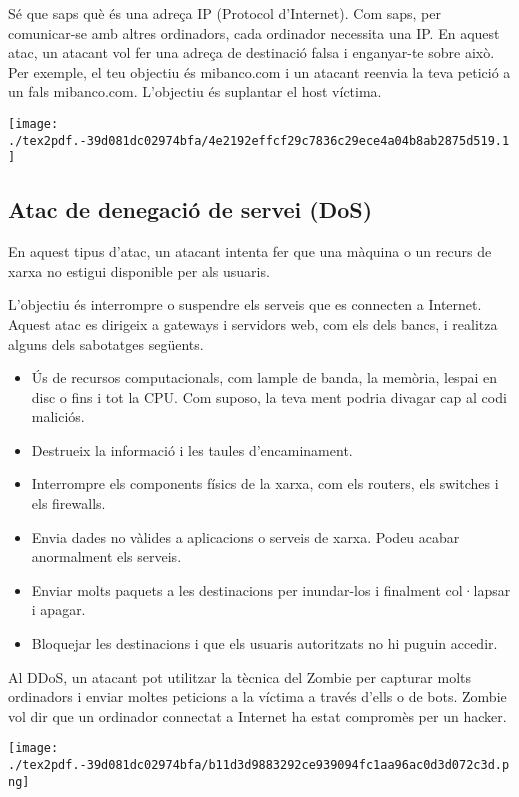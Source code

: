 \documentclass[]{article}
\begin{document}
Sé que saps què és una adreça IP (Protocol d'Internet). Com saps, per
comunicar-se amb altres ordinadors, cada ordinador necessita una IP. En
aquest atac, un atacant vol fer una adreça de destinació falsa i
enganyar-te sobre això. Per exemple, el teu objectiu és mibanco.com i un
atacant reenvia la teva petició a un fals mibanco.com. L'objectiu és
suplantar el host víctima.

\texttt{[image: ./tex2pdf.-39d081dc02974bfa/4e2192effcf29c7836c29ece4a04b8ab2875d519.1]}

\hypertarget{atac-de-denegaciuxf3-de-servei-dos}{%
\subsection{Atac de denegació de servei
(DoS)}\label{atac-de-denegaciuxf3-de-servei-dos}}

En aquest tipus d'atac, un atacant intenta fer que una màquina o un
recurs de xarxa no estigui disponible per als usuaris.

L'objectiu és interrompre o suspendre els serveis que es connecten a
Internet. Aquest atac es dirigeix ​​a gateways i servidors web, com els
dels bancs, i realitza alguns dels sabotatges següents.

\begin{itemize}
\item
  Ús de recursos computacionals, com lample de banda, la memòria, lespai
  en disc o fins i tot la CPU. Com suposo, la teva ment podria divagar
  cap al codi maliciós.
\item
  Destrueix la informació i les taules d'encaminament.
\item
  Interrompre els components físics de la xarxa, com els routers, els
  switches i els firewalls.
\item
  Envia dades no vàlides a aplicacions o serveis de xarxa. Podeu acabar
  anormalment els serveis.
\item
  Enviar molts paquets a les destinacions per inundar-los i finalment
  col·lapsar i apagar.
\item
  Bloquejar les destinacions i que els usuaris autoritzats no hi puguin
  accedir.
\end{itemize}

Al DDoS, un atacant pot utilitzar la tècnica del Zombie per capturar
molts ordinadors i enviar moltes peticions a la víctima a través d'ells
o de bots. Zombie vol dir que un ordinador connectat a Internet ha estat
compromès per un hacker.

\texttt{[image: ./tex2pdf.-39d081dc02974bfa/b11d3d9883292ce939094fc1aa96ac0d3d072c3d.png]}
\end{document}
